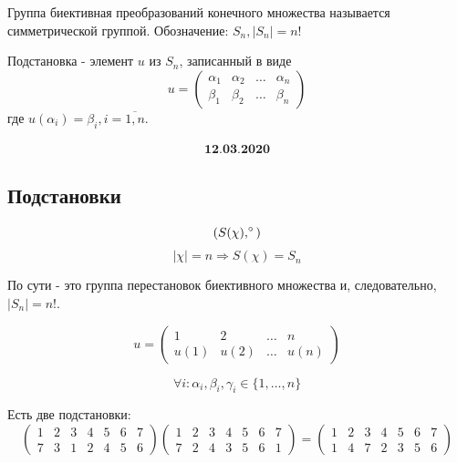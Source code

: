 \begin{definition}
	Группа биективная преобразований конечного множества называется симметрической группой. Обозначение: $S_n, |S_n| = n!$
\end{definition}

\begin{definition}[Подстановка]
	Подстановка - элемент $u$ из $S_n$, записанный в виде
	\[
	u =
	\begin{pmatrix}
		\alpha_1 & \alpha_2 & \dots & \alpha_n \\
		\beta_1 & \beta_2 & \dots & \beta_n
	\end{pmatrix}
	\]
	где $u(\alpha_i) = \beta_i, i = \overline{1,n}$.
\end{definition}

\begin{align}
	\textbf{12.03.2020}
\end{align}

\subsection{Подстановки}

\[ (S(\chi), \degree) \]
\[ |\chi| = n \Rightarrow S(\chi) = S_n \]

По сути - это группа перестановок биективного множества и, следовательно, $|S_n| = n!$.

\[ u = 
\begin{pmatrix}
	1 & 2 & \dots & n \\
	u(1) & u(2) & \dots & u(n)
\end{pmatrix}
\]

\[ \forall i: \alpha_i, \beta_i, \gamma_i \in \{1,\dots,n\} \]

\begin{exmp}
	Есть две подстановки:
	\[
	\begin{pmatrix}
		1 & 2 & 3 & 4 & 5 & 6 & 7 \\
		7 & 3 & 1 & 2 & 4 & 5 & 6
	\end{pmatrix}
	\begin{pmatrix}
		1 & 2 & 3 & 4 & 5 & 6 & 7 \\
		7 & 2 & 4 & 3 & 5 & 6 & 1
	\end{pmatrix}
	=
	\begin{pmatrix}
	1 & 2 & 3 & 4 & 5 & 6 & 7 \\
	1 & 4 & 7 & 2 & 3 & 5 & 6
	\end{pmatrix}
	\] 
\end{exmp}

